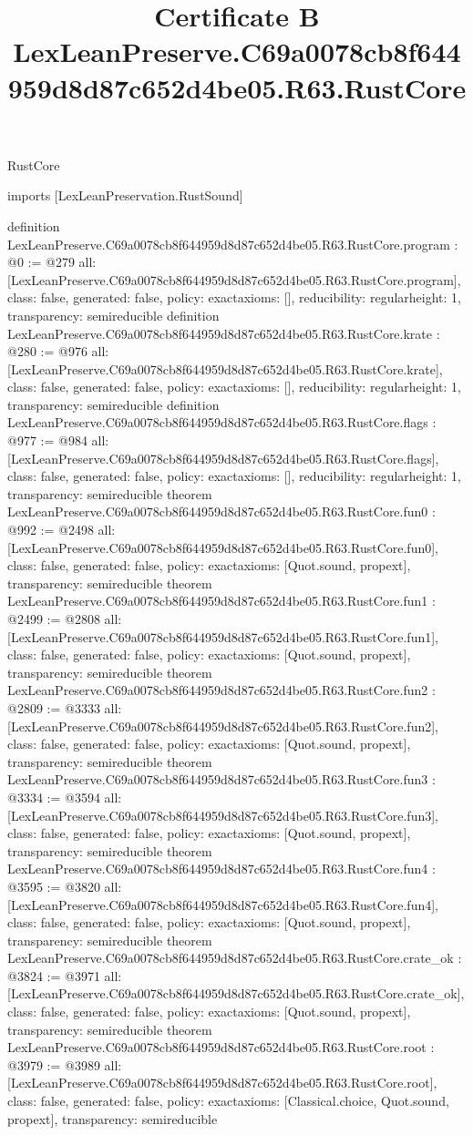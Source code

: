 \begin{lexlean}{RustCore}
\title{Certificate B LexLeanPreserve.C69a0078cb8f644959d8d87c652d4be05.R63.RustCore}
\begin{coremodule}
imports [LexLeanPreservation.RustSound]

definition LexLeanPreserve.C69a0078cb8f644959d8d87c652d4be05.R63.RustCore.program : @0 := @279 {
  all: [LexLeanPreserve.C69a0078cb8f644959d8d87c652d4be05.R63.RustCore.program],
  class: false,
  generated: false,
  policy: exact{axioms: []},
  reducibility: regular{height: 1},
  transparency: semireducible
}
definition LexLeanPreserve.C69a0078cb8f644959d8d87c652d4be05.R63.RustCore.krate : @280 := @976 {
  all: [LexLeanPreserve.C69a0078cb8f644959d8d87c652d4be05.R63.RustCore.krate],
  class: false,
  generated: false,
  policy: exact{axioms: []},
  reducibility: regular{height: 1},
  transparency: semireducible
}
definition LexLeanPreserve.C69a0078cb8f644959d8d87c652d4be05.R63.RustCore.flags : @977 := @984 {
  all: [LexLeanPreserve.C69a0078cb8f644959d8d87c652d4be05.R63.RustCore.flags],
  class: false,
  generated: false,
  policy: exact{axioms: []},
  reducibility: regular{height: 1},
  transparency: semireducible
}
theorem LexLeanPreserve.C69a0078cb8f644959d8d87c652d4be05.R63.RustCore.fun0 : @992 := @2498 {
  all: [LexLeanPreserve.C69a0078cb8f644959d8d87c652d4be05.R63.RustCore.fun0],
  class: false,
  generated: false,
  policy: exact{axioms: [Quot.sound, propext]},
  transparency: semireducible
}
theorem LexLeanPreserve.C69a0078cb8f644959d8d87c652d4be05.R63.RustCore.fun1 : @2499 := @2808 {
  all: [LexLeanPreserve.C69a0078cb8f644959d8d87c652d4be05.R63.RustCore.fun1],
  class: false,
  generated: false,
  policy: exact{axioms: [Quot.sound, propext]},
  transparency: semireducible
}
theorem LexLeanPreserve.C69a0078cb8f644959d8d87c652d4be05.R63.RustCore.fun2 : @2809 := @3333 {
  all: [LexLeanPreserve.C69a0078cb8f644959d8d87c652d4be05.R63.RustCore.fun2],
  class: false,
  generated: false,
  policy: exact{axioms: [Quot.sound, propext]},
  transparency: semireducible
}
theorem LexLeanPreserve.C69a0078cb8f644959d8d87c652d4be05.R63.RustCore.fun3 : @3334 := @3594 {
  all: [LexLeanPreserve.C69a0078cb8f644959d8d87c652d4be05.R63.RustCore.fun3],
  class: false,
  generated: false,
  policy: exact{axioms: [Quot.sound, propext]},
  transparency: semireducible
}
theorem LexLeanPreserve.C69a0078cb8f644959d8d87c652d4be05.R63.RustCore.fun4 : @3595 := @3820 {
  all: [LexLeanPreserve.C69a0078cb8f644959d8d87c652d4be05.R63.RustCore.fun4],
  class: false,
  generated: false,
  policy: exact{axioms: [Quot.sound, propext]},
  transparency: semireducible
}
theorem LexLeanPreserve.C69a0078cb8f644959d8d87c652d4be05.R63.RustCore.crate_ok : @3824 := @3971 {
  all: [LexLeanPreserve.C69a0078cb8f644959d8d87c652d4be05.R63.RustCore.crate_ok],
  class: false,
  generated: false,
  policy: exact{axioms: [Quot.sound, propext]},
  transparency: semireducible
}
theorem LexLeanPreserve.C69a0078cb8f644959d8d87c652d4be05.R63.RustCore.root : @3979 := @3989 {
  all: [LexLeanPreserve.C69a0078cb8f644959d8d87c652d4be05.R63.RustCore.root],
  class: false,
  generated: false,
  policy: exact{axioms: [Classical.choice, Quot.sound, propext]},
  transparency: semireducible
}


\end{coremodule}
\end{lexlean}
